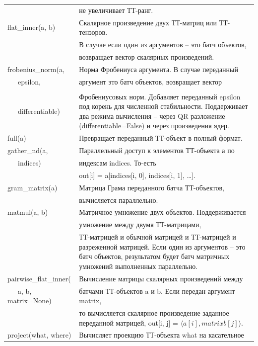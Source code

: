 \begin{longtable}[c]{ll}
 & не увеличивает ТТ-ранг.\\
flat\_inner(a, b) & Скалярное произведение двух ТТ-матриц или ТТ-тензоров. \\
& В случае если один из аргументов -- это батч объектов, \\
& возвращает вектор скалярных произведений.\\
frobenius\_norm(a, & Норма Фробениуса аргумента. В случае переданный \\
~~~epsilon, & аргумент это батч объектов, возвращает вектор \\\\
~~~differentiable) & Фробениусовых норм. Добавляет переданный epsilon под корень для численной стабильности. Поддерживает два режима вычисления -- через QR разложение (differentiable=False) и через произведения ядер.\\
full(a) & Превращает переданный ТТ-объект в полный формат.\\
gather\_nd(a, & Параллельный доступ к элементов ТТ-объекта а по \\
~~~indices) &  индексам indices. То-есть \\
& out[i] = a[indices[i, 0], indices[i, 1], …].\\
gram\_matrix(a) & Матрица Грама переданного батча ТТ-объектов,\\
& вычисляется параллельно.\\
matmul(a, b) & Матричное умножение двух объектов. Поддерживается\\
&  умножение между двумя ТТ-матрицами, \\
& ТТ-матрицей и обычной матрицей и ТТ-матрицей и разреженной матрицей. Если один из аргументов -- это батч объектов, результатом будет батч матричных умножений выполненных параллельно.\\
pairwise\_flat\_inner( & Вычисление матрицы скалярных произведений между \\
~~~a, b, matrix=None) & батчами ТТ-объектов a и b. Если передан аргумент matrix, \\
& то вычисляется скалярное произведение заданное переданной матрицей, out[i, j] = $\langle a[i], matrix b[j] \rangle$.\\
project(what, where) & Вычисляет проекцию ТТ-объекта what на касательное \\

\end{longtable}
